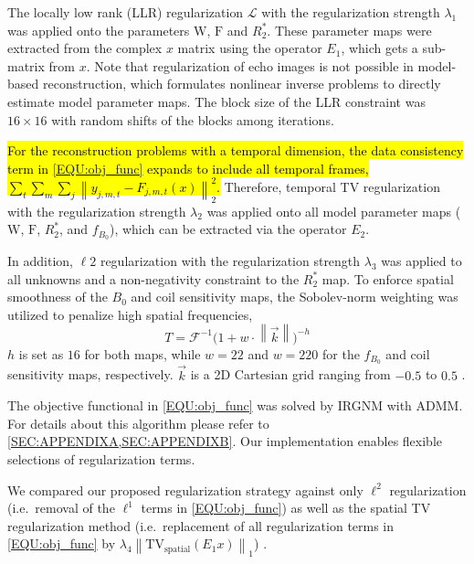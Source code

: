\documentclass[journal,twoside,web]{ieeecolor}
\newcommand*{\norm}[1]{\left\lVert#1\right\rVert}
\begin{document}
The locally low rank (LLR) regularization $\mathcal{L}$ with the regularization strength $\lambda_1$
was applied onto the parameters $\mathrm{W}$, $\mathrm{F}$ and $R_2^*$. 
These parameter maps were extracted from the complex $x$ matrix using the operator $E_1$, 
which gets a sub-matrix from $x$. 
Note that regularization of echo images is not possible in model-based reconstruction, 
which formulates nonlinear inverse problems to directly estimate model parameter maps. 
The block size of the LLR constraint was $16 \times 16$ 
with random shifts of the blocks among iterations.

 \hl{For the reconstruction problems with a temporal dimension, 
the data consistency term in \mbox{\cref{EQU:obj_func}} 
expands to include all temporal frames, 
\mbox{$\sum_t \sum_m \sum_j \norm{y_{j,m,t} - F_{j,m,t}(x)}_2^2$}.} 
Therefore, temporal TV regularization \cite{feng_2014_grasp} 
with the regularization strength $\lambda_2$ was applied onto 
all model parameter maps ($\mathrm{W}$, $\mathrm{F}$, $R_2^*$, and $f_{B_0}$), 
which can be extracted via the operator $E_2$.

In addition, $\ell2$ regularization with the regularization strength $\lambda_3$ 
was applied to all unknowns and 
a non-negativity constraint to the $R_2^*$ map.
To enforce spatial smoothness of the $B_0$ and coil sensitivity maps, 
the Sobolev-norm weighting \cite{uecker_2008_nlinv} 
was utilized to penalize high spatial frequencies, 
\begin{equation}
	T = \mathcal{F}^{-1} \bigg(1 + w \cdot \norm{\vec{k}} \bigg)^{-h}
\end{equation}
$h$ is set as $16$ for both maps, 
while $w = 22$ and $w = 220$ for the $f_{B_0}$ and coil sensitivity maps, 
respectively. $\vec{k}$ is a 2D Cartesian grid ranging from $-0.5$ to $0.5$ 
\cite{tan_2019_mobawf}.

The objective functional in \cref{EQU:obj_func} was solved by IRGNM with ADMM. 
For details about this algorithm please refer to 
\cref{SEC:APPENDIXA,SEC:APPENDIXB}. 
Our implementation enables flexible selections of regularization terms. 

We compared our proposed regularization strategy against only $\ell^2$ regularization 
(i.e.~removal of the $\ell^1$ terms in \cref{EQU:obj_func}) 
as well as the spatial TV regularization method 
(i.e.~replacement of all regularization terms in \cref{EQU:obj_func} by 
$\lambda_4 \norm{\text{TV}_\text{spatial} (E_1 x)}_1$) \cite{schneider_2020_mobawfr2s}.
\end{document}

